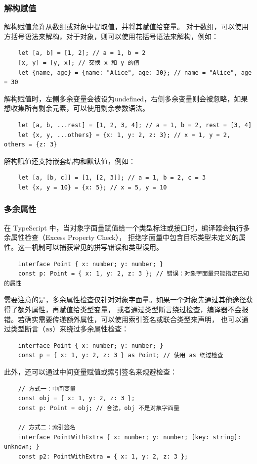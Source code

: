 \subsubsection{解构赋值}
解构赋值允许从数组或对象中提取值，并将其赋值给变量。
对于数组，可以使用方括号语法来解构，对于对象，则可以使用花括号语法来解构，例如：
\begin{verbatim}
    let [a, b] = [1, 2]; // a = 1, b = 2
    [x, y] = [y, x]; // 交换 x 和 y 的值
    let {name, age} = {name: "Alice", age: 30}; // name = "Alice", age = 30
\end{verbatim}
解构赋值时，左侧多余变量会被设为undefined，右侧多余变量则会被忽略，如果想收集所有剩余元素，可以使用剩余参数语法。
\begin{verbatim}
    let [a, b, ...rest] = [1, 2, 3, 4]; // a = 1, b = 2, rest = [3, 4]
    let {x, y, ...others} = {x: 1, y: 2, z: 3}; // x = 1, y = 2, others = {z: 3}
\end{verbatim}
解构赋值还支持嵌套结构和默认值，例如：
\begin{verbatim}
    let [a, [b, c]] = [1, [2, 3]]; // a = 1, b = 2, c = 3
    let {x, y = 10} = {x: 5}; // x = 5, y = 10
\end{verbatim}

\subsubsection{多余属性}
在 TypeScript 中，当对象字面量赋值给一个类型标注或接口时，编译器会执行多余属性检查（Excess Property Check），
拒绝字面量中包含目标类型未定义的属性。这一机制可以捕获常见的拼写错误和类型误用。
\begin{verbatim}
    interface Point { x: number; y: number; }
    const p: Point = { x: 1, y: 2, z: 3 }; // 错误：对象字面量只能指定已知的属性
\end{verbatim}
需要注意的是，多余属性检查仅针对对象字面量。如果一个对象先通过其他途径获得了额外属性，再赋值给类型变量，
或者通过类型断言绕过检查，编译器不会报错。若确实需要传递额外属性，可以使用索引签名或联合类型来声明，
也可以通过类型断言（\verb|as|）来绕过多余属性检查：
\begin{verbatim}
    interface Point { x: number; y: number; }
    const p = { x: 1, y: 2, z: 3 } as Point; // 使用 as 绕过检查
\end{verbatim}
此外，还可以通过中间变量赋值或索引签名来规避检查：
\begin{verbatim}
    // 方式一：中间变量
    const obj = { x: 1, y: 2, z: 3 };
    const p: Point = obj; // 合法，obj 不是对象字面量

    // 方式二：索引签名
    interface PointWithExtra { x: number; y: number; [key: string]: unknown; }
    const p2: PointWithExtra = { x: 1, y: 2, z: 3 };
\end{verbatim}

